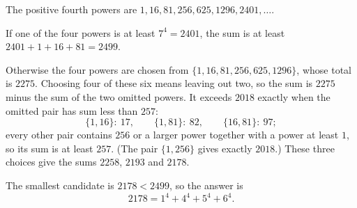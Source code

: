 The positive fourth powers are $1,16,81,256,625,1296,2401,\dots$.

If one of the four powers is at least $7^4=2401$, the sum is at least $2401+1+16+81=2499$.

Otherwise the four powers are chosen from $\{1,16,81,256,625,1296\}$, whose total is $2275$. Choosing four of these six means leaving out two, so the sum is $2275$ minus the sum of the two omitted powers. It exceeds $2018$ exactly when the omitted pair has sum less than $257$:
\[\{1,16\}:\ 17,\qquad\{1,81\}:\ 82,\qquad\{16,81\}:\ 97;\]
every other pair contains $256$ or a larger power together with a power at least $1$, so its sum is at least $257$. (The pair $\{1,256\}$ gives exactly $2018$.) These three choices give the sums $2258$, $2193$ and $2178$.

The smallest candidate is $2178<2499$, so the answer is
\[\boxed{2178}=1^4+4^4+5^4+6^4.\]
